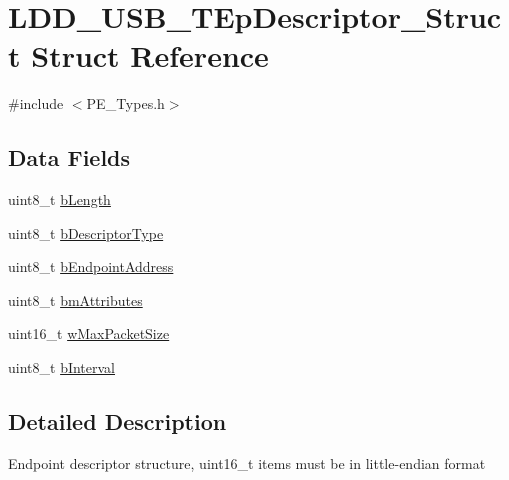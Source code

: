 \hypertarget{struct_l_d_d___u_s_b___t_ep_descriptor___struct}{\section{L\-D\-D\-\_\-\-U\-S\-B\-\_\-\-T\-Ep\-Descriptor\-\_\-\-Struct Struct Reference}
\label{struct_l_d_d___u_s_b___t_ep_descriptor___struct}
}


{\ttfamily \#include $<$P\-E\-\_\-\-Types.\-h$>$}

\subsection*{Data Fields}
\begin{DoxyCompactItemize}
\item 
uint8\-\_\-t \hyperlink{struct_l_d_d___u_s_b___t_ep_descriptor___struct_ad4cc2b6088c7fb913f40eada94098393}{b\-Length}
\item 
uint8\-\_\-t \hyperlink{struct_l_d_d___u_s_b___t_ep_descriptor___struct_aecc71d9488627adeb5f7de1e71fc45d1}{b\-Descriptor\-Type}
\item 
uint8\-\_\-t \hyperlink{struct_l_d_d___u_s_b___t_ep_descriptor___struct_a62745d5a897f76419a136579b2fbca02}{b\-Endpoint\-Address}
\item 
uint8\-\_\-t \hyperlink{struct_l_d_d___u_s_b___t_ep_descriptor___struct_a7a3e6205355d7fa84899f23ac8e58490}{bm\-Attributes}
\item 
uint16\-\_\-t \hyperlink{struct_l_d_d___u_s_b___t_ep_descriptor___struct_a19e3e6b0524f2fcd25377f008c94c3c6}{w\-Max\-Packet\-Size}
\item 
uint8\-\_\-t \hyperlink{struct_l_d_d___u_s_b___t_ep_descriptor___struct_a17aac2d9a945d37748eb0422bb811df2}{b\-Interval}
\end{DoxyCompactItemize}


\subsection{Detailed Description}
Endpoint descriptor structure, uint16\-\_\-t items must be in little-\/endian format 

